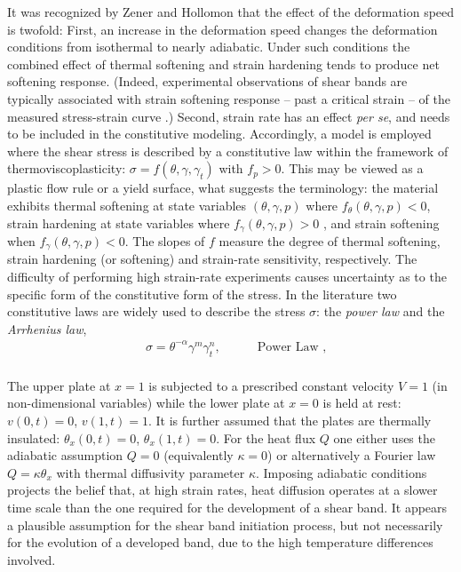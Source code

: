 \documentclass[a4paper,11pt]{article}
\theoremstyle{remark}
\begin{document}
It was recognized by Zener and Hollomon \cite{ZH} that the effect of the deformation speed is twofold: 
First, an increase in the deformation speed changes the deformation conditions from isothermal 
to nearly adiabatic. Under such conditions the combined effect of thermal softening and strain hardening 
tends to produce net softening response. (Indeed, experimental observations of shear bands 
are  typically associated  with strain softening response -- past a critical strain -- 
of the measured stress-strain curve \cite{CDHS}.)
Second, strain rate has an effect {\it per se}, and needs to be included in the constitutive modeling.
Accordingly, a model is employed where  the shear stress is described by a constitutive law 
within the framework  of thermoviscoplasticity: $\sigma = f(\theta, \gamma, \gamma_t)$ with $f_p > 0$.
This may be viewed as a plastic flow rule or a yield surface, what suggests the terminology: 
the material exhibits thermal softening at state variables $(\theta, \gamma, p)$ 
where $f_\theta(\theta, \gamma, p) < 0$, strain hardening at state variables where $f_\gamma(\theta, \gamma, p) > 0$ , and strain softening when $f_\gamma(\theta, \gamma, p) < 0$. 
The slopes of $f$ measure the degree of thermal softening, strain hardening (or softening) 
and strain-rate sensitivity, respectively. 
The difficulty of performing high strain-rate experiments causes uncertainty as to the specific form of the constitutive form of the stress.  In the literature two constitutive 
laws are widely used to describe the stress $\sigma$:
 the \emph{power law} and the \emph{Arrhenius law},
\begin{align}
&  \sigma =  \theta^{-\alpha} \gamma^{m} \gamma_{t}^{n}, \quad & &  \text{ Power Law }, \label{PL0}\\
\end{align}


The upper plate at $x=1$ is subjected to a prescribed constant velocity $V=1$  (in non-dimensional variables) while the lower plate at $x=0$ is held at rest: $v(0,t) = 0$,  $v(1,t) = 1$.
It is further assumed that the plates are thermally insulated:  $ \theta_{x}(0,t) = 0$,  $\theta_{x}(1,t) = 0$.
For the heat flux $Q$ one either uses the adiabatic assumption $Q = 0$ (equivalently $\kappa = 0$)
or alternatively a Fourier  law $Q = \kappa \theta_{x}$ with thermal diffusivity
parameter $\kappa$.
Imposing adiabatic conditions projects the belief that, at high strain rates,
heat diffusion operates at a slower time scale than the one required for the development 
of a shear band. It appears a plausible assumption for the shear band initiation process, 
but not necessarily for the evolution of a developed band,
 due to the high temperature differences involved.
 
\end{document}

